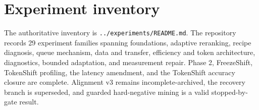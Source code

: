 \appendix
\chapter{Experiment inventory}
The authoritative inventory is \texttt{.\linebreak[1].\linebreak[1]/\linebreak[1]experiments/\linebreak[1]README.\linebreak[1]md}. The repository records 29 experiment families spanning foundations, adaptive reranking, recipe diagnosis, queue mechanism, data and transfer, efficiency and token architecture, diagnostics, bounded adaptation, and measurement repair. Phase 2, FreezeShift, TokenShift profiling, the latency amendment, and the TokenShift accuracy closure are complete. Alignment v3 remains incomplete-archived, the recovery branch is superseded, and guarded hard-negative mining is a valid stopped-by-gate result.

